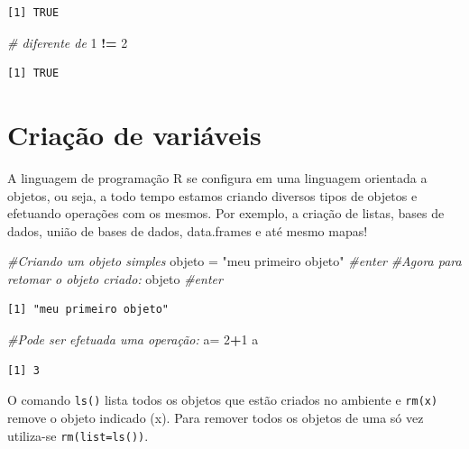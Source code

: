 \documentclass[12pt,brazil,]{book}
\newenvironment{Shaded}{\begin{snugshade}}{\end{snugshade}}
\newcommand{\CommentTok}[1]{\textcolor[rgb]{0.56,0.35,0.01}{\textit{#1}}}
\newcommand{\DecValTok}[1]{\textcolor[rgb]{0.00,0.00,0.81}{#1}}
\newcommand{\NormalTok}[1]{#1}
\newcommand{\OperatorTok}[1]{\textcolor[rgb]{0.81,0.36,0.00}{\textbf{#1}}}
\newcommand{\StringTok}[1]{\textcolor[rgb]{0.31,0.60,0.02}{#1}}
\begin{document}
\begin{verbatim}
[1] TRUE
\end{verbatim}

\begin{Shaded}
\begin{Highlighting}[]
\CommentTok{# diferente de}
\DecValTok{1} \OperatorTok{!=}\StringTok{ }\DecValTok{2}
\end{Highlighting}
\end{Shaded}

\begin{verbatim}
[1] TRUE
\end{verbatim}

\hypertarget{criacao-de-variaveis}{%
\section{Criação de variáveis}\label{criacao-de-variaveis}}

A linguagem de programação R se configura em uma linguagem orientada a
objetos, ou seja, a todo tempo estamos criando diversos tipos de objetos
e efetuando operações com os mesmos. Por exemplo, a criação de listas,
bases de dados, união de bases de dados, data.frames e até mesmo mapas!

\begin{Shaded}
\begin{Highlighting}[]
\CommentTok{#Criando um objeto simples}
\NormalTok{objeto =}\StringTok{ "meu primeiro objeto"} \CommentTok{#enter}
\CommentTok{#Agora para retomar o objeto criado:}
\NormalTok{objeto }\CommentTok{#enter}
\end{Highlighting}
\end{Shaded}

\begin{verbatim}
[1] "meu primeiro objeto"
\end{verbatim}

\begin{Shaded}
\begin{Highlighting}[]
\CommentTok{#Pode ser efetuada uma operação:}
\NormalTok{a=}\StringTok{ }\DecValTok{2}\OperatorTok{+}\DecValTok{1}
\NormalTok{a}
\end{Highlighting}
\end{Shaded}

\begin{verbatim}
[1] 3
\end{verbatim}

O comando \texttt{ls()} lista todos os objetos que estão criados no
ambiente e \texttt{rm(x)} remove o objeto indicado (x). Para remover
todos os objetos de uma só vez utiliza-se \texttt{rm(list=ls())}.
\end{document}
